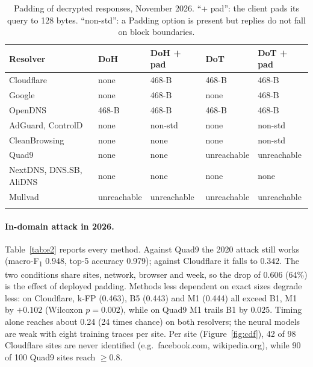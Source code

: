 \documentclass[pdflatex,sn-mathphys-num]{sn-jnl}
\newcommand{\Fone}{F\textsubscript{1}}
\begin{document}
\begin{table}[t]
\caption{Padding of decrypted responses, November 2026. ``+ pad'': the client pads its query to 128 bytes. ``non-std'': a Padding option is present but replies do not fall on block boundaries.}\label{tab:audit}
\scriptsize
\begin{tabular*}{\textwidth}{@{\extracolsep\fill}lllll@{}}
\toprule
Resolver & DoH & DoH + pad & DoT & DoT + pad \\
\midrule
Cloudflare & none & 468-B & 468-B & 468-B \\
Google & none & 468-B & none & 468-B \\
OpenDNS & 468-B & 468-B & 468-B & 468-B \\
AdGuard, ControlD & none & non-std & none & non-std \\
CleanBrowsing & none & none & none & non-std \\
Quad9 & none & none & unreachable & unreachable \\
NextDNS, DNS.SB, AliDNS & none & none & none & none \\
Mullvad & unreachable & unreachable & unreachable & unreachable \\
\botrule
\end{tabular*}
\end{table}

\paragraph{In-domain attack in 2026.} Table~\ref{tab:e2} reports every method. Against Quad9 the 2020 attack still works (macro-\Fone{} $0.948$, top-5 accuracy 0.979); against Cloudflare it falls to $0.342$. The two conditions share sites, network, browser and week, so the drop of 0.606 (64\%) is the effect of deployed padding. Methods less dependent on exact sizes degrade less: on Cloudflare, k-FP (0.463), B5 (0.443) and M1 (0.444) all exceed B1, M1 by $+0.102$ (Wilcoxon $p=0.002$), while on Quad9 M1 trails B1 by $0.025$. Timing alone reaches about 0.24 (24 times chance) on both resolvers; the neural models are weak with eight training traces per site. Per site (Figure~\ref{fig:cdf}), 42 of 98 Cloudflare sites are never identified (e.g.\ facebook.com, wikipedia.org), while 90 of 100 Quad9 sites reach $\ge0.8$.
\end{document}
